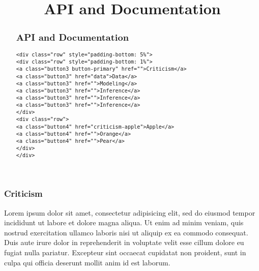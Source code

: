 \title{API and Documentation}

\begin{abstract}
\subsection{API and Documentation}
\begin{lstlisting}[raw=html]
<div class="row" style="padding-bottom: 5%">
<div class="row" style="padding-bottom: 1%">
<a class="button3 button-primary" href="">Criticism</a>
<a class="button3" href="data">Data</a>
<a class="button3" href="">Modeling</a>
<a class="button3" href="">Inference</a>
<a class="button3" href="">Inference</a>
<a class="button3" href="">Inference</a>
</div>
<div class="row">
<a class="button4" href="criticism-apple">Apple</a>
<a class="button4" href="">Orange</a>
<a class="button4" href="">Pear</a>
</div>
</div>
\end{lstlisting}
\end{abstract}

\subsubsection{Criticism}
Lorem ipsum dolor sit amet, consectetur adipisicing elit, sed do eiusmod
tempor incididunt ut labore et dolore magna aliqua. Ut enim ad minim veniam,
quis nostrud exercitation ullamco laboris nisi ut aliquip ex ea commodo
consequat. Duis aute irure dolor in reprehenderit in voluptate velit esse
cillum dolore eu fugiat nulla pariatur. Excepteur sint occaecat cupidatat non
proident, sunt in culpa qui officia deserunt mollit anim id est laborum.
